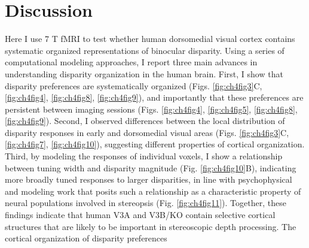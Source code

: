 \section{Discussion}
Here I use 7 T fMRI to test whether human dorsomedial visual cortex contains systematic organized representations of binocular disparity. Using a series of computational modeling approaches, I report three main advances in understanding disparity organization in the human brain. First, I show that disparity preferences are systematically organized (Figs. \ref{fig:ch4fig3}C, \ref{fig:ch4fig4}, \ref{fig:ch4fig8}, \ref{fig:ch4fig9}), and importantly that these preferences are persistent between imaging sessions (Figs. \ref{fig:ch4fig4}, \ref{fig:ch4fig5}, \ref{fig:ch4fig8}, \ref{fig:ch4fig9}). Second, I observed differences between the local distribution of disparity responses in early and dorsomedial visual areas (Figs. \ref{fig:ch4fig3}C, \ref{fig:ch4fig7}, \ref{fig:ch4fig10}), suggesting different properties of cortical organization. Third, by modeling the responses of individual voxels, I show a relationship between tuning width and disparity magnitude (Fig. \ref{fig:ch4fig10}B), indicating more broadly tuned responses to larger disparities, in line with psychophysical and modeling work that posits such a relationship as a characteristic property of neural populations involved in stereopsis (Fig. \ref{fig:ch4fig11}). Together, these findings indicate that human V3A and V3B/KO contain selective cortical structures that are likely to be important in stereoscopic depth processing.
The cortical organization of disparity preferences

